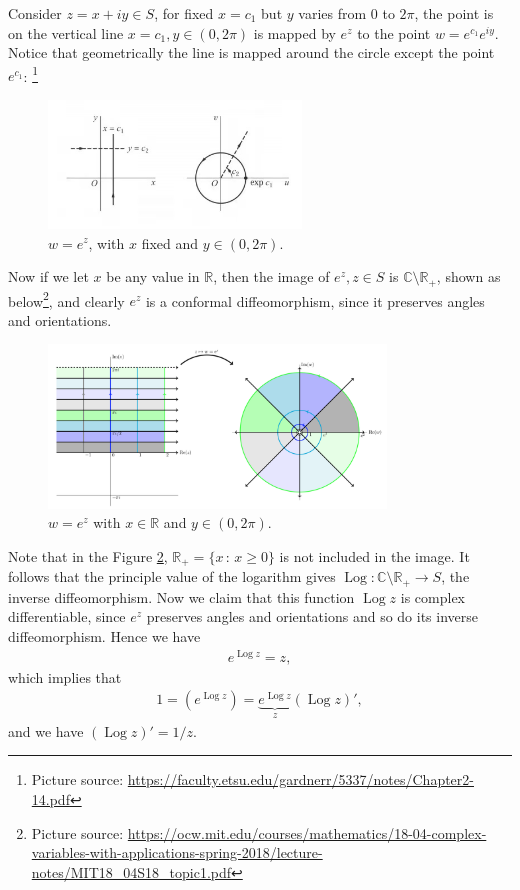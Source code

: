 \documentclass[11pt]{book}
\theoremstyle{definition}
\numberwithin{equation}{chapter}
\begin{document}
Consider $z = x + iy \in S$, for fixed $x = c_1$ but $y$ varies from $0$ to $2\pi$, the point is on the vertical line $x = c_1, y \in (0,2\pi)$ is mapped by $e^z$ to the point $w = e^{c_1} e^{iy}$. Notice that  geometrically the line is mapped around the circle except the point $e^{c_1}$: \footnote{Picture source: \url{https://faculty.etsu.edu/gardnerr/5337/notes/Chapter2-14.pdf}}
\begin{figure}[H]
    \centering
    \includegraphics[width=0.6\textwidth]{logarithm_image.jpg}
    \caption{$w = e^z$, with $x$ fixed and $y \in (0,2\pi)$.}
    \label{fig:logarithm_1}
\end{figure}
Now if we let $x$ be any value in $\mathbb{R}$, then the image of $e^z, z \in S$ is $\mathbb{C} \setminus \mathbb{R}_{+}$, shown as below\footnote{Picture source: \url{https://ocw.mit.edu/courses/mathematics/18-04-complex-variables-with-applications-spring-2018/lecture-notes/MIT18_04S18_topic1.pdf}}, and clearly $e^z$ is a conformal diffeomorphism, since it preserves angles and orientations.
\begin{figure}[H]
    \centering
    \includegraphics[width=0.8\textwidth]{logarithm_image2.png}
    \caption{$w = e^z$ with $x \in \mathbb{R}$ and $y \in (0,2\pi)$.}
    \label{fig:logarithm_2}
\end{figure}
Note that in the Figure \ref{fig:logarithm_2}, $\mathbb{R}_{+} = \{x \,:\, x \geq 0\}$ is not included in the image. It follows that the principle value of the logarithm gives $\operatorname{Log} : \mathbb{C} \setminus \mathbb{R}_{+} \to S$, the inverse diffeomorphism. Now we claim that this function $\operatorname{Log} z$ is complex differentiable, since $e^z$ preserves angles and orientations and so do its inverse diffeomorphism. Hence we have 
\begin{align*}
    e^{\operatorname{Log} z} = z,
\end{align*}
which implies that
\begin{align*}
    1 = \left(e^{\operatorname{Log} z}\right) = \underbrace{e^{\operatorname{Log} z}}_{z} \left(\operatorname{Log} z\right)',
\end{align*}
and we have $\left(\operatorname{Log} z\right)' = 1/z$. 
\end{document}
